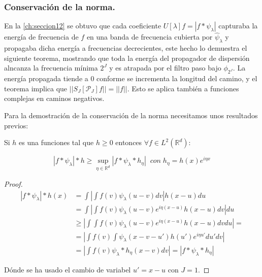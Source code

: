 \subsubsection{Conservación de la norma.}

En la \autoref{ch:seccion12} se obtuvo que cada coeficiente $U[\lambda]f=|f \ast \psi_\lambda|$ capturaba la energía de frecuencia de $f$ en una banda de frecuencia cubierta por $\widehat{\psi}_\lambda$ y propagaba dicha energía a frecuencias decrecientes, este hecho lo demuestra el siguiente teorema, mostrando que toda la energía del propagador de dispersión alncanza la frecuencia mínima $2^J$ y es atrapada por el filtro paso bajo $\phi_ {2^J}$. La energía propagada tiende a $0$ conforme se incrementa la longitud del camino, y el teorema implica que $||S_J[\mathcal{P}_J]f||=||f||$. Esto se aplica también a funciones complejas en caminos negativos.

\medskip

\noindent Para la demostración de la conservación de la norma necesitamos unos resultados previos: 

\begin{lema} \label{lema::Cota_inferior}
  Si $h$ es una funciones tal que $h\geq 0$ entonces $\forall f \in L^2(\mathbb{R}^d)$: 
  
  \begin{equation}
    |f \ast \psi_\lambda | \ast h \geq \sup_{\eta \in \mathbb{R}^d} |f\ast \psi_\lambda \ast h_\eta | \; \; con \; h_\eta=h(x)e^{i\eta x}
  \end{equation}
\end{lema}
  
\begin{proof}
  
  \begin{align*}
      |f \ast \psi_\lambda | \ast h (x) &= \int \left| \int f(v)\psi_\lambda(u-v)dv \right| h(x-u)du \\
      &=\int \left | \int f(v) \psi_\lambda(u-v) e^{i\eta(x-u)} h(x-u) dv \right| du \\
      &\geq \left | \int \int f(v) \psi_\lambda(u-v) e^{i\eta(x-u)} h(x-u) dv du \right| = \\
      &= \left | \int f(v) \int  \psi_\lambda(x-v-u')h(u') e^{i\eta u'}  du' dv \right| \\
      &= \left | \int f(v) \psi_\lambda \ast h_\eta(x-v) dv \right| = |f\ast \psi_\lambda \ast h_\eta|
  \end{align*}

  \noindent Dónde se ha usado el cambio de variabel $u'=x-u$ con $J=1$.
\end{proof}

